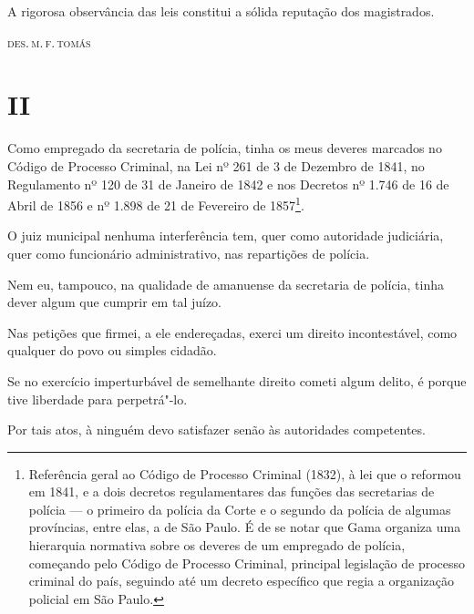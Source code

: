 \epigraph{A rigorosa observância das leis constitui a sólida reputação dos
magistrados.}{\textsc{des.\,m.\,f.\,tomás}\footnotemark}

\section*{II}

\noindent{}Como empregado da secretaria de polícia, tinha os meus deveres marcados
no Código de Processo Criminal, na Lei nº 261 de 3 de Dezembro de 1841,
no Regulamento nº 120 de 31 de Janeiro de 1842 e nos Decretos nº 1.746
de 16 de Abril de 1856 e nº 1.898 de 21 de Fevereiro de 1857\footnote{
  Referência geral ao Código de Processo Criminal (1832), à lei que o
  reformou em 1841, e a dois decretos regulamentares das funções das
  secretarias de polícia --- o primeiro da polícia da Corte e o segundo da
  polícia de algumas províncias, entre elas, a de São Paulo. É de se
  notar que Gama organiza uma hierarquia normativa sobre os deveres de
  um empregado de polícia, começando pelo Código de Processo Criminal,
  principal legislação de processo criminal do país, seguindo até um
  decreto específico que regia a organização policial em São Paulo.}.


O juiz municipal nenhuma interferência tem, quer como autoridade
judiciária, quer como funcionário administrativo, nas repartições de
polícia.

Nem eu, tampouco, na qualidade de amanuense da secretaria de polícia,
tinha dever algum que cumprir em tal juízo.

Nas petições que firmei, a ele endereçadas, exerci um direito
incontestável, como qualquer do povo ou simples cidadão.

Se no exercício imperturbável de semelhante direito cometi algum delito,
é porque tive liberdade para perpetrá"-lo.

Por tais atos, à ninguém devo satisfazer senão às autoridades
competentes.

